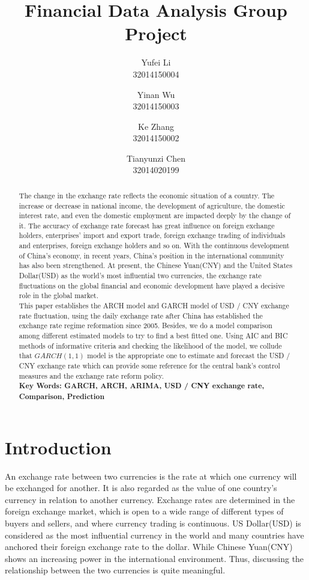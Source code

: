 \documentclass[12pt, a4paper, titlepage]{article}
\title{Financial Data Analysis Group Project\\
}
\author{Yufei Li  \\
	32014150004  \\
	\and 
	Yinan Wu \\
	32014150003 \\
	\and
	Ke Zhang\\
	32014150002\\
	\and
	Tianyunzi Chen\\
	32014020199
	}
\date{}
\begin{document}
\maketitle

\begin{abstract}
The change in the exchange rate reflects the economic situation of a country. The increase or decrease in national income, the development of agriculture, the domestic interest rate, and even the domestic employment are impacted deeply by the change of it. The accuracy of exchange rate forecast has great influence on foreign exchange holders, enterprises' import and export trade, foreign exchange trading of individuals and enterprises, foreign exchange holders and so on. With the continuous development of China's economy, in recent years, China's position in the international community has also been strengthened. At present, the Chinese Yuan(CNY) and the United States Dollar(USD) as the world's most influential two currencies, the exchange rate fluctuations on the global financial and economic development have played a decisive role in the global market.\\

This paper establishes the ARCH model and GARCH model of USD / CNY exchange rate fluctuation, using the daily exchange rate after China has established the exchange rate regime reformation since 2005. Besides, we do a model comparison among different estimated models to try to find a best fitted one. Using AIC and BIC methods of informative criteria and checking the likelihood of the model, we collude that $GARCH(1,1)$ model is the appropriate one to estimate and forecast the USD / CNY exchange rate which can provide some reference for the central bank's control measures and the exchange rate reform policy.\\

\textbf{Key Words: GARCH, ARCH, ARIMA, USD / CNY exchange rate, Comparison, Prediction} 
\end{abstract}

\tableofcontents 
\newpage

\section{Introduction}
An exchange rate between two currencies is the rate at which one currency will be exchanged for another. It is also regarded as the value of one country’s currency in relation to another currency. Exchange rates are determined in the foreign exchange market, which is open to a wide range of different types of buyers and sellers, and where currency trading is continuous. US Dollar(USD) is considered as the most influential currency in the world and many countries have anchored their foreign exchange rate to the dollar. While Chinese Yuan(CNY) shows an increasing power in the international environment. Thus, discussing the relationship between the two currencies is quite meaningful.\\
 
\end{document}
